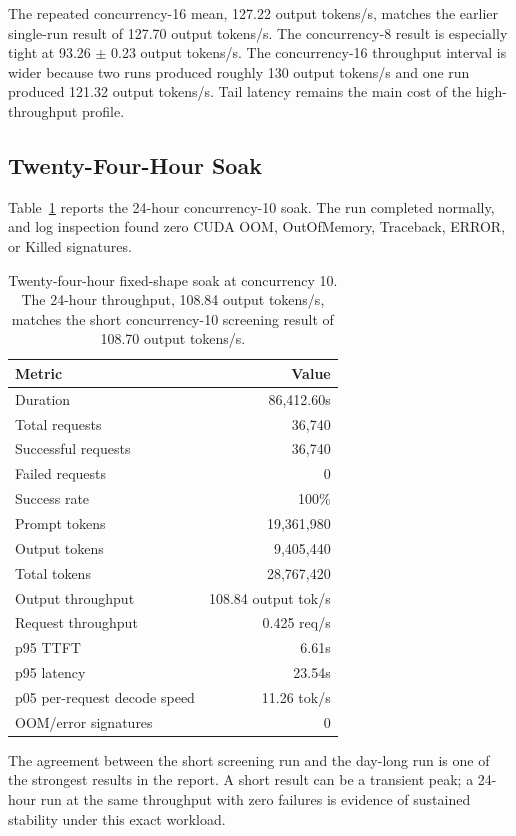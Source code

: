 \documentclass[11pt]{article}
\begin{document}
The repeated concurrency-16 mean, 127.22 output tokens/s, matches the earlier
single-run result of 127.70 output tokens/s. The concurrency-8 result is
especially tight at 93.26 $\pm$ 0.23 output tokens/s. The concurrency-16
throughput interval is wider because two runs produced roughly 130 output
tokens/s and one run produced 121.32 output tokens/s. Tail latency remains the
main cost of the high-throughput profile.

\subsection{Twenty-Four-Hour Soak}

Table~\ref{tab:soak} reports the 24-hour concurrency-10 soak. The run completed
normally, and log inspection found zero CUDA OOM, OutOfMemory, Traceback, ERROR,
or Killed signatures.

\begin{table}[h]
\centering
\small
\begin{tabular}{lr}
\toprule
Metric & Value \\
\midrule
Duration & 86,412.60s \\
Total requests & 36,740 \\
Successful requests & 36,740 \\
Failed requests & 0 \\
Success rate & 100\% \\
Prompt tokens & 19,361,980 \\
Output tokens & 9,405,440 \\
Total tokens & 28,767,420 \\
Output throughput & 108.84 output tok/s \\
Request throughput & 0.425 req/s \\
p95 TTFT & 6.61s \\
p95 latency & 23.54s \\
p05 per-request decode speed & 11.26 tok/s \\
OOM/error signatures & 0 \\
\bottomrule
\end{tabular}
\caption{Twenty-four-hour fixed-shape soak at concurrency 10. The 24-hour
throughput, 108.84 output tokens/s, matches the short concurrency-10 screening
result of 108.70 output tokens/s.}
\label{tab:soak}
\end{table}

The agreement between the short screening run and the day-long run is one of the
strongest results in the report. A short result can be a transient peak; a
24-hour run at the same throughput with zero failures is evidence of sustained
stability under this exact workload.
\end{document}
